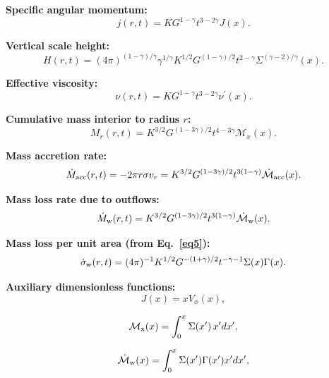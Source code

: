 \documentclass[twocolumn,linenumbers]{aastex631}
\begin{document}
\textbf{Specific angular momentum:}
\begin{equation}
j(r,t) = K G^{1-\gamma} t^{3-2\gamma} J(x).
\end{equation}

\textbf{Vertical scale height:}
\begin{equation}
H(r,t) = (4\pi)^{(1-\gamma)/\gamma} \gamma^{1/\gamma} K^{1/2} G^{(1-\gamma)/2} t^{2-\gamma} \Sigma^{(\gamma-2)/\gamma}(x).
\end{equation}

\textbf{Effective viscosity:}
\begin{equation}
\nu(r,t) = K G^{1-\gamma} t^{3-2\gamma} \nu^{\prime}(x).
\end{equation}

\textbf{Cumulative mass interior to radius $r$:}
\begin{equation}
M_{r}(r,t) = K^{3/2} G^{(1-3\gamma)/2} t^{4-3\gamma} \mathcal{M}_{x}(x).
\label{eq:Mrp}
\end{equation}

\textbf{Mass accretion rate:}
\begin{equation}
\dot{M}_{\rm acc}(r,t) = -2\pi r \sigma v_{r} = K^{3/2} G^{(1-3\gamma)/2} t^{3(1-\gamma)} \dot{\mathcal{M}}_{\rm acc}(x).
\end{equation}

\textbf{Mass loss rate due to outflows:}
\begin{equation}
\dot{M}_{\rm w}(r,t) = K^{3/2} G^{(1-3\gamma)/2} t^{3(1-\gamma)} \dot{\mathcal{M}}_{\rm w}(x).
\end{equation}

\textbf{Mass loss per unit area (from Eq.~\ref{eq5}):}
\begin{equation}
\dot{\sigma}_{\rm w}(r,t) = (4\pi)^{-1} K^{1/2} G^{-(1+\gamma)/2} t^{-\gamma-1} \Sigma(x) \Gamma(x)
\label{eq:mwp}.
\end{equation}

\textbf{Auxiliary dimensionless functions:}
\begin{equation}
J(x) = x V_{\phi}(x),
\end{equation}

\begin{equation}
\mathcal{M}_{\rm x}(x) = \int_0^x \Sigma(x')\, x' dx'
\label{eq:Mx},
\end{equation}

\begin{equation}
\dot{\mathcal{M}}_{\rm w}(x) = \int_0^x \Sigma(x') \Gamma(x') x' dx' ,
\end{equation}
\end{document}
